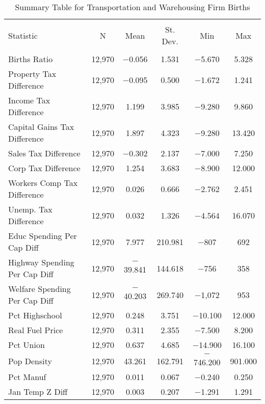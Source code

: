 
\begin{table}[!htbp] \centering 
  \caption{Summary Table for  Transportation and Warehousing Firm Births} 
  \label{48-49summary} 
\begin{tabular}{@{\extracolsep{5pt}}lccccc} 
\\[-1.8ex]\hline 
\hline \\[-1.8ex] 
Statistic & \multicolumn{1}{c}{N} & \multicolumn{1}{c}{Mean} & \multicolumn{1}{c}{St. Dev.} & \multicolumn{1}{c}{Min} & \multicolumn{1}{c}{Max} \\ 
\hline \\[-1.8ex] 
Births Ratio & 12,970 & $-$0.056 & 1.531 & $-$5.670 & 5.328 \\ 
Property Tax Difference & 12,970 & $-$0.095 & 0.500 & $-$1.672 & 1.241 \\ 
Income Tax Difference & 12,970 & 1.199 & 3.985 & $-$9.280 & 9.860 \\ 
Capital Gains Tax Difference & 12,970 & 1.897 & 4.323 & $-$9.280 & 13.420 \\ 
Sales Tax Difference & 12,970 & $-$0.302 & 2.137 & $-$7.000 & 7.250 \\ 
Corp Tax Difference & 12,970 & 1.254 & 3.683 & $-$8.900 & 12.000 \\ 
Workers Comp Tax Difference & 12,970 & 0.026 & 0.666 & $-$2.762 & 2.451 \\ 
Unemp. Tax Difference & 12,970 & 0.032 & 1.326 & $-$4.564 & 16.070 \\ 
Educ Spending Per Cap Diff & 12,970 & 7.977 & 210.981 & $-$807 & 692 \\ 
Highway Spending Per Cap Diff & 12,970 & $-$39.841 & 144.618 & $-$756 & 358 \\ 
Welfare Spending Per Cap Diff & 12,970 & $-$40.203 & 269.740 & $-$1,072 & 953 \\ 
Pct Highschool & 12,970 & 0.248 & 3.751 & $-$10.100 & 12.000 \\ 
Real Fuel Price & 12,970 & 0.311 & 2.355 & $-$7.500 & 8.200 \\ 
Pct Union & 12,970 & 0.637 & 4.685 & $-$14.900 & 16.100 \\ 
Pop Density & 12,970 & 43.261 & 162.791 & $-$746.200 & 901.000 \\ 
Pct Manuf & 12,970 & 0.011 & 0.067 & $-$0.240 & 0.250 \\ 
Jan Temp Z Diff & 12,970 & 0.003 & 0.207 & $-$1.291 & 1.291 \\ 

\end{tabular}
\end{table}
